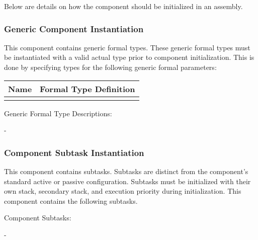 Below are details on how the component should be initialized in an assembly.

\subsubsection{Generic Component Instantiation}
This component contains generic formal types. These generic formal types must be instantiated with a valid actual type prior to component initialization. This is done by specifying types for the following generic formal parameters:

\begin{xltabular}{\textwidth}{ | l | X | }
  \hline
  \textbf{Name} & \textbf{Formal Type Definition} \\ \hline
  \texttt{} & \texttt{}  \\ \hline
\end{xltabular}
\vspace{5mm} %

Generic Formal Type Descriptions:
\begin{spaceditemize}
  \item \textbf{\texttt{}} - 
\end{spaceditemize}
\vspace{5mm} %

\subsubsection{Component Subtask Instantiation}

This component contains subtasks. Subtasks are distinct from the component's standard active or passive configuration. Subtasks must be initialized with their own stack, secondary stack, and execution priority during initialization. This component contains the following subtasks.
\vspace{5mm} %

Component Subtasks:
\begin{spaceditemize}
  \item \textbf{\texttt{}} - 
\end{spaceditemize}
\vspace{5mm} %

